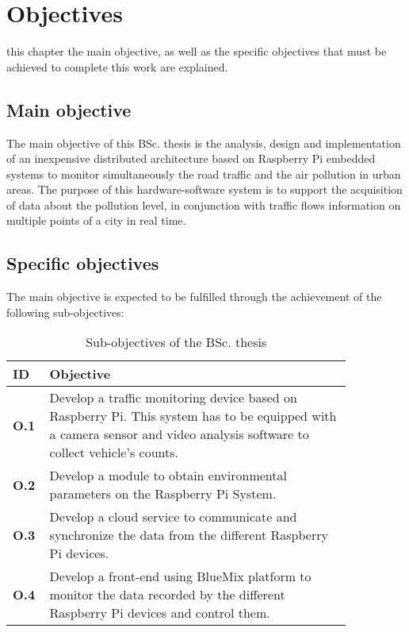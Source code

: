 
\chapter{Objectives}
\label{chap:objectives}

 this chapter the main objective, as well as the specific objectives that must be achieved to complete this work are explained.

\section{Main objective}
\label{chap:main-objective} 
The main objective of this \ac{BSc.} thesis is the analysis, design and implementation of an inexpensive distributed architecture based on Raspberry Pi embedded systems to monitor simultaneously the road traffic and the air pollution in urban areas. The purpose of this hardware-software system is to support the acquisition of data about the pollution level, in conjunction with traffic flows information on multiple points of a city in real time. 


\section{Specific objectives}
The main objective is expected to be fulfilled through the achievement of the following sub-objectives:

\begin{table}[!h]
	\centering
	\caption{Sub-objectives of the BSc. thesis}
	\label{tab:sub-objectives}
	
	\begin{tabular}{m{0.05\linewidth}m{0.8\linewidth}}
		\textbf{ID} & \textbf{Objective} \\
		\hline
		
		\textbf{O.1}& Develop a traffic monitoring device based on Raspberry Pi. This system has to be equipped with a camera sensor and video analysis software to collect vehicle’s counts.  \\
		
		\textbf{O.2}& Develop a module to obtain environmental parameters on the Raspberry Pi System.  \\
		
		\textbf{O.3}& Develop a cloud service to communicate and synchronize the data from the different Raspberry Pi devices.  \\
		
		\textbf{O.4}& Develop a front-end using BlueMix platform to monitor the data recorded by the different Raspberry Pi devices and control them.  \\
		
		\hline
	\end{tabular}
\end{table}


